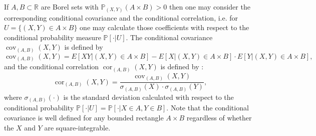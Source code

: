 \documentclass[sn-mathphys,Numbered,11pt]{sn-jnl}%
\theoremstyle{thmstyleone}%
\newcommand{\R}{\mathbb{R}}
\newcommand{\PP}{\mathbb{P}}
\newcommand{\cov}{\operatorname{cov}}
\newcommand{\cor}{\operatorname{cor}}
\begin{document}
 If $A,B\subset\R$ are Borel sets with $\PP_{(X,Y)}(A\times B)>0$ then one may consider the corresponding conditional covariance and the conditional correlation, i.e. for $U=\{(X,Y)\in A\times B\}$   one may calculate those coefficients with respect to the conditional probability measure $\PP[\cdot|U]$. The conditional covariance $\cov_{(A,B)}(X,Y)$ is defined by 
$$\cov_{(A,B)}(X,Y)
=E[XY|(X,Y)\in A\times B]-E[X|(X,Y)\in A\times B]\cdot E[Y|(X,Y)\in A\times B],$$
and the conditional correlation $\cor_{(A,B)}(X,Y)$ is defined by : 
$$\cor_{(A,B)}(X,Y)=\frac{\cov_{(A,B)}(X,Y)}{\sigma_{(A,B)}(X)\cdot \sigma_{(A,B)}(Y)},$$
where $\sigma_{(A,B)}(\cdot)$ is the standard deviation calculated with respect to the conditional probability $\PP[\cdot|U]=\PP[\cdot|X\in A, Y\in B]$.  Note that the conditional covariance is well defined for any bounded rectangle $A\times B$ regardless of whether the  $X$ and $Y$ are square-integrable.
\end{document}
